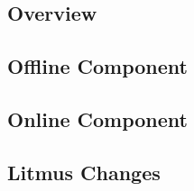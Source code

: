 \subsection{Overview}
\subsection{Offline Component}
\subsection{Online Component}
\subsection{Litmus Changes}